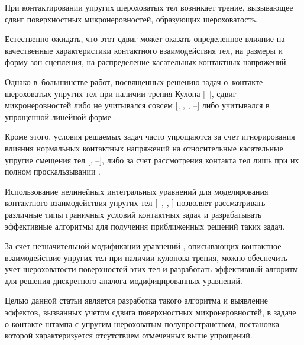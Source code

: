 \date{13/XI/2014} %







\makerutitle








При контактировании упругих шероховатых тел возникает трение, вызывающее сдвиг поверхностных микронеровностей, образующих шероховатость. 

Естественно ожидать, что этот сдвиг может оказать определенное влияние на качественные характеристики контактного взаимодействия тел, на размеры и форму зон сцепления, на распределение касательных контактных напряжений. 

Однако в~большинстве работ, посвященных решению задач о~контакте шероховатых упругих тел при наличии трения Кулона [--], сдвиг микронеровностей либо не учитывался совсем  [, , , --] либо учитывался в упрощенной линейной форме \cite{al:bib2, al:bib5, al:bib6}. 

Кроме этого, условия решаемых задач часто упрощаются за счет игнорирования влияния нормальных контактных напряжений на относительные касательные упругие смещения тел [, --], либо за счет рассмотрения контакта тел лишь при их полном проскальзывании \cite{al:bib4}. 

Использование нелинейных интегральных уравнений для моделирования контактного взаимодействия упругих тел [--, , ] позволяет рассматривать различные типы граничных условий контактных задач и разрабатывать эффективные алгоритмы для получения приближенных решений таких задач. 

За счет незначительной модификации уравнений \cite{al:bib11}, описывающих контактное взаимодействие упругих тел при наличии кулонова трения, можно обеспечить учет шероховатости поверхностей этих тел и разработать эффективный алгоритм для решения дискретного аналога модифицированных уравнений. 

Целью данной статьи является разработка такого алгоритма и выявление эффектов, вызванных учетом сдвига поверхностных микронеровностей, в задаче о контакте штампа с упругим шероховатым полупространством, постановка которой характеризуется отсутствием отмеченных выше упрощений.



